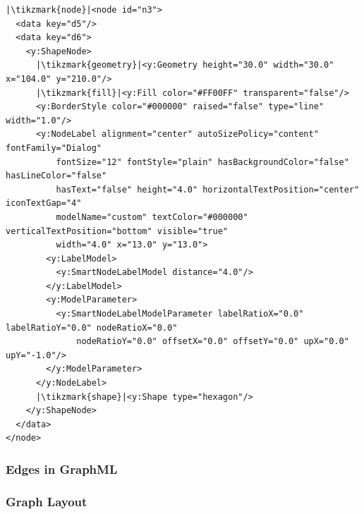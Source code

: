 {\begin{frame}[fragile]
  \begin{verbatim}
|\tikzmark{node}|<node id="n3">
  <data key="d5"/>
  <data key="d6">
    <y:ShapeNode>
      |\tikzmark{geometry}|<y:Geometry height="30.0" width="30.0" x="104.0" y="210.0"/>
      |\tikzmark{fill}|<y:Fill color="#FF00FF" transparent="false"/>
      <y:BorderStyle color="#000000" raised="false" type="line" width="1.0"/>
      <y:NodeLabel alignment="center" autoSizePolicy="content" fontFamily="Dialog"
          fontSize="12" fontStyle="plain" hasBackgroundColor="false" hasLineColor="false"
          hasText="false" height="4.0" horizontalTextPosition="center" iconTextGap="4"
          modelName="custom" textColor="#000000" verticalTextPosition="bottom" visible="true"
          width="4.0" x="13.0" y="13.0">
        <y:LabelModel>
          <y:SmartNodeLabelModel distance="4.0"/>
        </y:LabelModel>
        <y:ModelParameter>
          <y:SmartNodeLabelModelParameter labelRatioX="0.0" labelRatioY="0.0" nodeRatioX="0.0"
              nodeRatioY="0.0" offsetX="0.0" offsetY="0.0" upX="0.0" upY="-1.0"/>
        </y:ModelParameter>
      </y:NodeLabel>
      |\tikzmark{shape}|<y:Shape type="hexagon"/>
    </y:ShapeNode>
  </data>
</node>
  \end{verbatim}
\end{frame}

\subsubsection{Edges in GraphML}
\begin{frame}[fragile]
  \frametitle{Graph Layout }
  \vspace{12mm}
  

\end{frame}}
